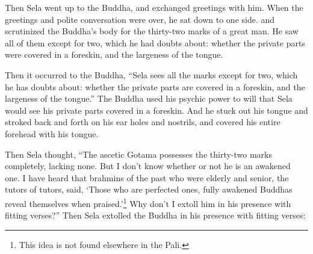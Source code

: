 \documentclass[12pt,openany]{book}%
\begin{document}
Then Sela went up to the Buddha, and exchanged greetings with him. When the greetings and polite conversation were over, he sat down to one side. and scrutinized the Buddha’s body for the thirty-two marks of a great man. He saw all of them except for two, which he had doubts about: whether the private parts were covered in a foreskin, and the largeness of the tongue. 

Then it occurred to the Buddha, “Sela sees all the marks except for two, which he has doubts about: whether the private parts are covered in a foreskin, and the largeness of the tongue.” The Buddha used his psychic power to will that Sela would see his private parts covered in a foreskin. And he stuck out his tongue and stroked back and forth on his ear holes and nostrils, and covered his entire forehead with his tongue. 

Then Sela thought, “The ascetic Gotama possesses the thirty-two marks completely, lacking none. But I don’t know whether or not he is an awakened one. I have heard that brahmins of the past who were elderly and senior, the tutors of tutors, said, ‘Those who are perfected ones, fully awakened Buddhas reveal themselves when praised.’\footnote{This idea is not found elsewhere in the Pali. } Why don’t I extoll him in his presence with fitting verses?” Then Sela extolled the Buddha in his presence with fitting verses: 
\end{document}

